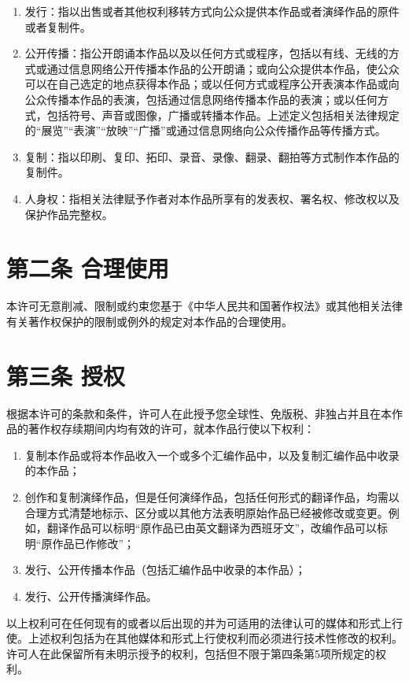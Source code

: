 \begin{enumerate}
	\item 发行：指以出售或者其他权利移转方式向公众提供本作品或者演绎作品的原件或者复制件。
	\item 公开传播：指公开朗诵本作品以及以任何方式或程序，包括以有线、无线的方式或通过信息网络公开传播本作品的公开朗诵；或向公众提供本作品，使公众可以在自己选定的地点获得本作品；或以任何方式或程序公开表演本作品或向公众传播本作品的表演，包括通过信息网络传播本作品的表演；或以任何方式，包括符号、声音或图像，广播或转播本作品。上述定义包括相关法律规定的“展览”“表演”“放映”“广播”或通过信息网络向公众传播作品等传播方式。
	\item 复制：指以印刷、复印、拓印、录音、录像、翻录、翻拍等方式制作本作品的复制件。
	\item 人身权：指相关法律赋予作者对本作品所享有的发表权、署名权、修改权以及保护作品完整权。
\end{enumerate}
\section{第二条 合理使用}
本许可无意削减、限制或约束您基于《中华人民共和国著作权法》或其他相关法律有关著作权保护的限制或例外的规定对本作品的合理使用。
\section{第三条 授权}
根据本许可的条款和条件，许可人在此授予您全球性、免版税、非独占并且在本作品的著作权存续期间内均有效的许可，就本作品行使以下权利：
\begin{enumerate}
	\item 复制本作品或将本作品收入一个或多个汇编作品中，以及复制汇编作品中收录的本作品；
	\item 创作和复制演绎作品，但是任何演绎作品，包括任何形式的翻译作品，均需以合理方式清楚地标示、区分或以其他方法表明原始作品已经被修改或变更。例如，翻译作品可以标明“原作品已由英文翻译为西班牙文”，改编作品可以标明“原作品已作修改”；
	\item 发行、公开传播本作品（包括汇编作品中收录的本作品）； 
	\item 发行、公开传播演绎作品。
\end{enumerate}
以上权利可在任何现有的或者以后出现的并为可适用的法律认可的媒体和形式上行使。上述权利包括为在其他媒体和形式上行使权利而必须进行技术性修改的权利。许可人在此保留所有未明示授予的权利，包括但不限于第四条第5项所规定的权利。
